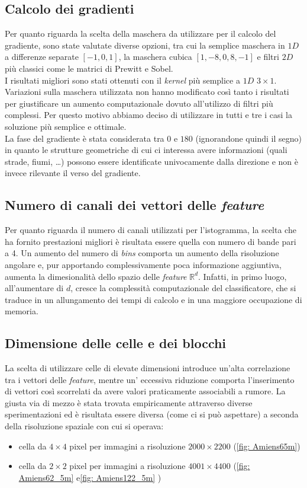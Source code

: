 \subsection{Calcolo dei gradienti}
Per quanto riguarda la scelta della maschera da utilizzare per il calcolo del gradiente, sono state valutate diverse opzioni, tra cui la semplice maschera in $1D$ a differenze separate $[-1, 0 ,1]$, la maschera cubica $[1,-8,0,8,-1]$ e filtri  $2D$ più classici come le matrici di Prewitt e Sobel.\\
I risultati migliori sono stati ottenuti con il \emph{kernel} più semplice a $1D$ $3\times1$. Variazioni sulla maschera utilizzata non hanno modificato così tanto i risultati per giustificare un aumento computazionale dovuto all'utilizzo di filtri più complessi. Per questo motivo abbiamo deciso di utilizzare in tutti e tre i casi la soluzione più semplice e ottimale.\\

La fase del gradiente è stata considerata tra $0$ e $180$ (ignorandone quindi il segno) in quanto le strutture geometriche di cui ci interessa avere informazioni (quali strade, fiumi, \ldots) possono essere identificate univocamente dalla direzione e non è invece rilevante il verso del gradiente.

\subsection{Numero di canali dei vettori delle \emph{feature}}
Per quanto riguarda il numero di canali utilizzati per l'istogramma, la scelta che ha fornito prestazioni migliori è risultata essere quella con numero di bande pari a 4. Un aumento del numero di \emph{bins} comporta un aumento della risoluzione angolare e, pur apportando complessivamente poca informazione aggiuntiva,  aumenta la dimesionalità dello spazio delle \emph{feature} $\mathbb{R}^d$. Infatti, in primo luogo, all'aumentare di $d$, cresce la complessità computazionale del classificatore, che si traduce in un allungamento dei tempi di calcolo e in una maggiore occupazione di memoria.

\subsection{Dimensione delle celle e dei blocchi}
La scelta di utilizzare celle di elevate dimensioni introduce un'alta correlazione tra i vettori delle \emph{feature}, mentre un' eccessiva riduzione comporta l'inserimento di vettori così scorrelati da avere valori praticamente associabili a rumore. La giusta via di mezzo è stata trovata empiricamente attraverso diverse sperimentazioni ed è risultata essere diversa (come ci si può aspettare) a seconda della risoluzione spaziale con cui si operava:
\begin{itemize}
\item cella da $4\times 4$ pixel per immagini a risoluzione $2000 \times 2200$ (\ref{fig: Amiens65m})
\item cella da $2 \times 2$ pixel per immagini a risoluzione $4001 \times 4400$ (\ref{fig: Amiens62_5m} e\ref{fig: Amiens122_5m} )
\end{itemize}

